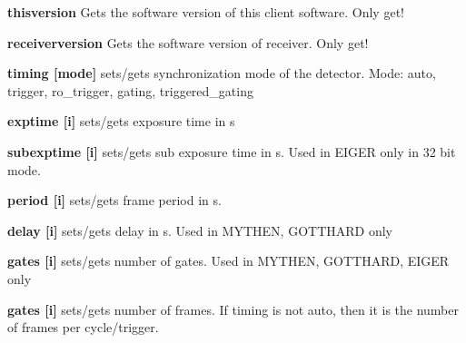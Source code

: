 \begin{DoxyItemize}
\item {\bfseries thisversion} Gets the software version of this client software. Only get!
\end{DoxyItemize}


\begin{DoxyItemize}
\item {\bfseries receiverversion} Gets the software version of receiver. Only get!
\end{DoxyItemize}


\begin{DoxyItemize}
\item {\bfseries timing \mbox{[}mode\mbox{]}} sets/gets synchronization mode of the detector. Mode: auto, trigger, ro\_\-trigger, gating, triggered\_\-gating
\end{DoxyItemize}


\begin{DoxyItemize}
\item {\bfseries exptime \mbox{[}i\mbox{]}} sets/gets exposure time in s
\end{DoxyItemize}


\begin{DoxyItemize}
\item {\bfseries subexptime \mbox{[}i\mbox{]}} sets/gets sub exposure time in s. Used in EIGER only in 32 bit mode.
\end{DoxyItemize}


\begin{DoxyItemize}
\item {\bfseries period \mbox{[}i\mbox{]}} sets/gets frame period in s.
\end{DoxyItemize}


\begin{DoxyItemize}
\item {\bfseries delay \mbox{[}i\mbox{]}} sets/gets delay in s. Used in MYTHEN, GOTTHARD only
\end{DoxyItemize}


\begin{DoxyItemize}
\item {\bfseries gates \mbox{[}i\mbox{]}} sets/gets number of gates. Used in MYTHEN, GOTTHARD, EIGER only
\end{DoxyItemize}


\begin{DoxyItemize}
\item {\bfseries gates \mbox{[}i\mbox{]}} sets/gets number of frames. If {\ttfamily timing} is not {\ttfamily auto}, then it is the number of frames per cycle/trigger.
\end{DoxyItemize}



